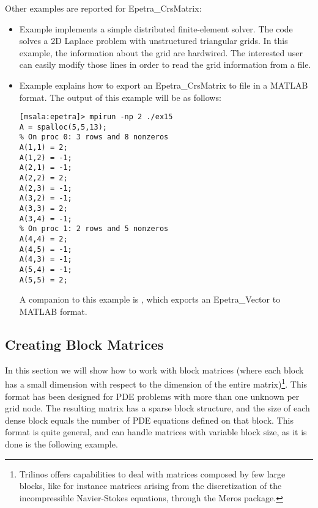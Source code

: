Other examples are reported for Epetra\_CrsMatrix:
\begin{itemize}
\item Example  implements a simple distributed
  finite-element solver.  The code solves a 2D Laplace problem with
  unstructured triangular grids. In this example, the information about
  the grid are hardwired.  The interested user can easily modify those
  lines in order to read the grid information from a file.
\item Example  explains how to export an
  Epetra\_CrsMatrix to file in a MATLAB format.  The output of this
  example will be as follows:
\begin{verbatim}
[msala:epetra]> mpirun -np 2 ./ex15
A = spalloc(5,5,13);
% On proc 0: 3 rows and 8 nonzeros
A(1,1) = 2;
A(1,2) = -1;
A(2,1) = -1;
A(2,2) = 2;
A(2,3) = -1;
A(3,2) = -1;
A(3,3) = 2;
A(3,4) = -1;
% On proc 1: 2 rows and 5 nonzeros
A(4,4) = 2;
A(4,5) = -1;
A(4,3) = -1;
A(5,4) = -1;
A(5,5) = 2;
\end{verbatim}
  A companion to this
  example is \newline {}, which exports an Epetra\_Vector to
  MATLAB format.
\end{itemize}

\subsection{Creating Block Matrices}
\label{sec:sparse_vbr}

In this section we will show how to work with block matrices (where each
block has a small dimension with respect to the dimension of the entire
matrix)\footnote{Trilinos offers capabilities to deal with matrices
  composed by few large blocks, like for instance matrices arising from
  the discretization of the incompressible Navier-Stokes equations,
  through the Meros package.}. This format has been designed for PDE
problems with more than one unknown per grid node.  The resulting matrix
has a sparse block structure, and the size of each dense block equals
the number of PDE equations defined on that block.  This format is quite
general, and can handle matrices with variable block size, as it is done
is the following example.

